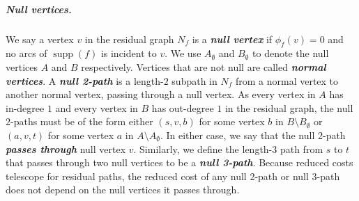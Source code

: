 \documentclass[a4paper,UKenglish]{socg-lipics-v2018}
\def\fsupply{\phi}
\def\supp{\operatorname{supp}}
\theoremstyle{plain}
\numberwithin{figure}{section}
\renewcommand{\paragraph}{\subparagraph}
\def\EMPH#1{\textbf{\emph{\boldmath #1}}}
\begin{document}
\paragraph{Null vertices.}
We say a vertex $v$ in the residual graph $N_f$ is a \EMPH{null vertex} if $\fsupply_f(v) = 0$ and no arcs of $\supp(f)$ is incident to $v$.
We use \EMPH{$A_\emptyset$} and \EMPH{$B_\emptyset$} to denote the null vertices $A$ and $B$ respectively.
Vertices that are not null are called \EMPH{normal vertices}.
%
A \EMPH{null 2-path} is a length-$2$ subpath in $N_f$ from a normal vertex to another normal vertex, passing through a null vertex.
As every vertex in $A$ has in-degree $1$ and every vertex in $B$ has out-degree $1$ in the residual graph, the null 2-paths must be of the form either $(s, v, b)$ for some vertex $b$ in $B \setminus B_\emptyset$ or $(a, v, t)$ for some vertex $a$ in $A \setminus A_\emptyset$.
In either case, we say that the null 2-path \EMPH{passes through} null vertex $v$.
%
Similarly, we define the length-$3$ path from $s$ to $t$ that passes through two null
vertices to be a \EMPH{null 3-path}.
%
Because reduced costs telescope for residual paths, the reduced cost of any null 2-path or null 3-path does not depend on the null vertices it passes through.
\end{document}
